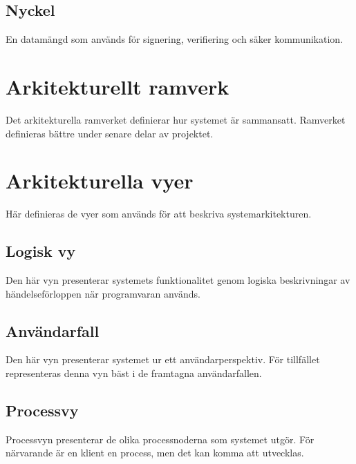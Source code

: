 \subsection*{Nyckel}
En datamängd som används för signering, verifiering och säker kommunikation.
\section{Arkitekturellt ramverk}
Det arkitekturella ramverket definierar hur systemet är sammansatt. Ramverket definieras bättre under senare delar av projektet.
\section{Arkitekturella vyer}
Här definieras de vyer som används för att beskriva systemarkitekturen.
\subsection{Logisk vy}
Den här vyn presenterar systemets funktionalitet genom logiska beskrivningar av händelseförloppen när programvaran används.
\subsection{Användarfall}
Den här vyn presenterar systemet ur ett användarperspektiv. För tillfället representeras denna vyn bäst i de framtagna användarfallen. 
\subsection{Processvy}
Processvyn presenterar de olika processnoderna som systemet utgör. För närvarande är en klient en process, men det kan komma att utvecklas.

